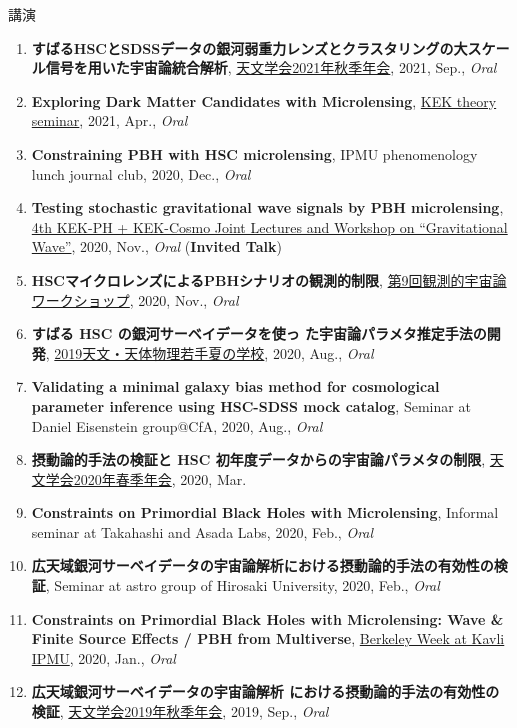 \begin{rSection}{講演}
\begin{enumerate}
\item \textbf{すばるHSCとSDSSデータの銀河弱重力レンズとクラスタリングの大スケール信号を用いた宇宙論統合解析}, \href{https://www.asj.or.jp/nenkai/archive/2021b/pdf/U05a.pdf}{天文学会2021年秋季年会}, 2021, Sep., \textit{Oral}
\item \textbf{Exploring Dark Matter Candidates with Microlensing}, \href{https://www.kek.jp/ja/conference/20210407-3/}{KEK theory seminar}, 2021, Apr., \textit{Oral}
\item \textbf{Constraining PBH with HSC microlensing}, IPMU phenomenology lunch journal club, 2020, Dec., \textit{Oral}
\item \textbf{Testing stochastic gravitational wave signals by PBH microlensing}, \href{http://conference-indico.kek.jp/event/117/timetable/#day-2020-11-04}{4th KEK-PH + KEK-Cosmo Joint Lectures and Workshop on ``Gravitational Wave''}, 2020, Nov., \textit{Oral} (\textbf{Invited Talk})
\item \textbf{HSCマイクロレンズによるPBHシナリオの観測的制限}, \href{https://indico.ipmu.jp/event/382/timetable/#all}{第9回観測的宇宙論ワークショップ}, 2020, Nov., \textit{Oral}
\item \textbf{すばる HSC の銀河サーベイデータを使っ た宇宙論パラメタ推定手法の開発}, \href{http://www.astro-wakate.org/ss2019/web/}{2019天文・天体物理若手夏の学校}, 2020, Aug., \textit{Oral}
\item \textbf{Validating a minimal galaxy bias method for cosmological parameter inference using HSC-SDSS mock catalog}, Seminar at Daniel Eisenstein group@CfA, 2020, Aug., \textit{Oral}
\item \textbf{摂動論的手法の検証と HSC 初年度データからの宇宙論パラメタの制限}, \href{http://www.asj.or.jp/nenkai/archive/2020a/pdf/U03a.pdf}{天文学会2020年春季年会}, 2020, Mar.
\item \textbf{Constraints on Primordial Black Holes with Microlensing}, Informal seminar at Takahashi and Asada Labs, 2020, Feb., \textit{Oral}
\item \textbf{広天域銀河サーベイデータの宇宙論解析における摂動論的手法の有効性の検証}, Seminar at astro group of Hirosaki University, 2020, Feb., \textit{Oral}
\item \textbf{Constraints on Primordial Black Holes with Microlensing: Wave \& Finite Source Effects / PBH from Multiverse}, \href{http://indico.ipmu.jp/event/313/overview}{Berkeley Week at Kavli IPMU}, 2020, Jan., \textit{Oral}
\item \textbf{広天域銀河サーベイデータの宇宙論解析 における摂動論的手法の有効性の検証}, \href{https://www.asj.or.jp/nenkai/archive/2019b/pdf/U20a.pdf}{天文学会2019年秋季年会}, 2019, Sep., \textit{Oral}

\end{enumerate}
\end{rSection}
